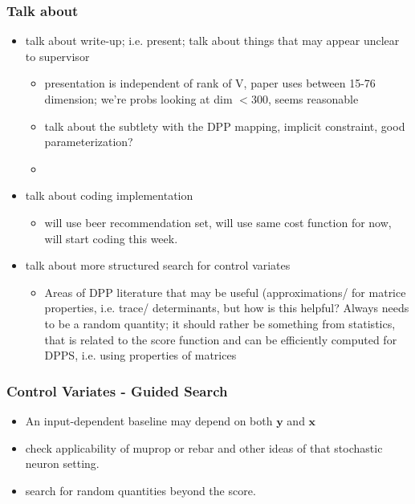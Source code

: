 \documentclass[12pt, oneside]{article}   	%
\begin{document}
\subsubsection*{Talk about}
\begin{itemize}
\item talk about write-up; i.e. present; talk about things that may appear unclear to supervisor
\begin{itemize}
\item presentation is independent of rank of V, paper uses between 15-76 dimension; we're probs looking at dim $< 300$, seems reasonable
\item talk about the subtlety with the DPP mapping, implicit constraint, good parameterization?
\item 
\end{itemize}
\item talk about coding implementation
\begin{itemize}
\item will use beer recommendation set, will use same cost function for now, will start coding this week.
\end{itemize}
\item talk about more structured search for control variates 
\begin{itemize}
\item Areas of DPP literature that may be useful (approximations/ for matrice properties, i.e. trace/ determinants, but how is this helpful? Always needs to be a random quantity; it should rather be something from statistics, that is related to the score function and can be efficiently computed for DPPS, i.e. using properties of matrices
\end{itemize}
\end{itemize}

\subsubsection*{Control Variates - Guided Search}
\begin{itemize}
\item An input-dependent baseline may depend on both $\textbf{y}$ and $\textbf{x}$
\item check applicability of muprop or rebar and other ideas of that stochastic neuron setting. 
\item search for random quantities beyond the score. 
\end{itemize}

\end{document}
